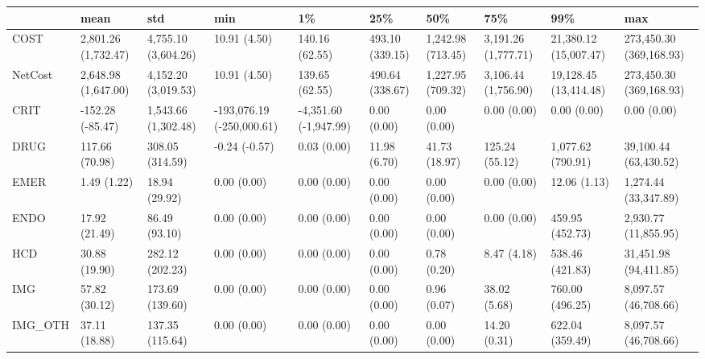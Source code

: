 \begin{tabular}{llllllllll}
\toprule
{} &                 mean &                  std &                        min &                     1\% &              25\% &                50\% &                  75\% &                    99\% &                      max \\
\midrule
COST     &  2,801.26 (1,732.47) &  4,755.10 (3,604.26) &               10.91 (4.50) &         140.16 (62.55) &  493.10 (339.15) &  1,242.98 (713.45) &  3,191.26 (1,777.71) &  21,380.12 (15,007.47) &  273,450.30 (369,168.93) \\
NetCost  &  2,648.98 (1,647.00) &  4,152.20 (3,019.53) &               10.91 (4.50) &         139.65 (62.55) &  490.64 (338.67) &  1,227.95 (709.32) &  3,106.44 (1,756.90) &  19,128.45 (13,414.48) &  273,450.30 (369,168.93) \\
CRIT     &     -152.28 (-85.47) &  1,543.66 (1,302.48) &  -193,076.19 (-250,000.61) &  -4,351.60 (-1,947.99) &      0.00 (0.00) &        0.00 (0.00) &          0.00 (0.00) &            0.00 (0.00) &              0.00 (0.00) \\
DRUG     &       117.66 (70.98) &      308.05 (314.59) &              -0.24 (-0.57) &            0.03 (0.00) &     11.98 (6.70) &      41.73 (18.97) &       125.24 (55.12) &      1,077.62 (790.91) &    39,100.44 (63,430.52) \\
EMER     &          1.49 (1.22) &        18.94 (29.92) &                0.00 (0.00) &            0.00 (0.00) &      0.00 (0.00) &        0.00 (0.00) &          0.00 (0.00) &           12.06 (1.13) &     1,274.44 (33,347.89) \\
ENDO     &        17.92 (21.49) &        86.49 (93.10) &                0.00 (0.00) &            0.00 (0.00) &      0.00 (0.00) &        0.00 (0.00) &          0.00 (0.00) &        459.95 (452.73) &     2,930.77 (11,855.95) \\
HCD      &        30.88 (19.90) &      282.12 (202.23) &                0.00 (0.00) &            0.00 (0.00) &      0.00 (0.00) &        0.78 (0.20) &          8.47 (4.18) &        538.46 (421.83) &    31,451.98 (94,411.85) \\
IMG      &        57.82 (30.12) &      173.69 (139.60) &                0.00 (0.00) &            0.00 (0.00) &      0.00 (0.00) &        0.96 (0.07) &         38.02 (5.68) &        760.00 (496.25) &     8,097.57 (46,708.66) \\
IMG\_OTH  &        37.11 (18.88) &      137.35 (115.64) &                0.00 (0.00) &            0.00 (0.00) &      0.00 (0.00) &        0.00 (0.00) &         14.20 (0.31) &        622.04 (359.49) &     8,097.57 (46,708.66) \\

\end{tabular}
